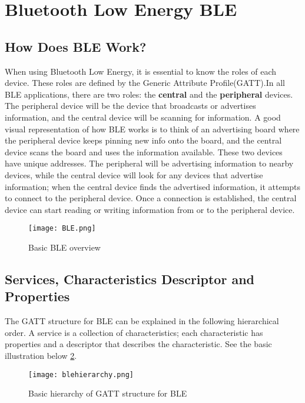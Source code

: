 \section{Bluetooth Low Energy BLE}
\label{sec:ble}

\subsection{How Does BLE Work?}
\label{sec:howdoesblework}

When using Bluetooth Low Energy, it is essential to know the roles of each device. These roles are defined by the Generic Attribute Profile(GATT).In all BLE applications, there are two roles: the \textbf{central} and the \textbf{peripheral} devices. \cite{josebagur2022} The peripheral device will be the device that broadcasts or advertises information, and the central device will be scanning for information. A good visual representation of how BLE works is to think of an advertising board where the peripheral device keeps pinning new info onto the board, and the central device scans the board and uses the information available. These two devices have unique addresses. The peripheral will be advertising information to nearby devices, while the central device will look for any devices that advertise information; when the central device finds the advertised information, it attempts to connect to the peripheral device. Once a connection is established, the central device can start reading or writing information from or to the peripheral device.

\begin{figure}[!h]
    \centering
    \texttt{[image: BLE.png]}
    \caption{Basic BLE overview}
    \label{fig:bleoverview}
\end{figure}



\subsection{Services, Characteristics Descriptor and Properties}
\label{sec:servicesandcharacteristics}
The GATT structure for BLE can be explained in the following hierarchical order. A service is a collection of characteristics; each characteristic has properties and a descriptor that describes the characteristic. See the basic illustration below \ref{fig:ble_roles}.

\begin{figure}[!h]
    \centering
    \texttt{[image: blehierarchy.png]}
    \caption{Basic hierarchy of GATT structure for BLE}
    \label{fig:ble_roles}
\end{figure}

